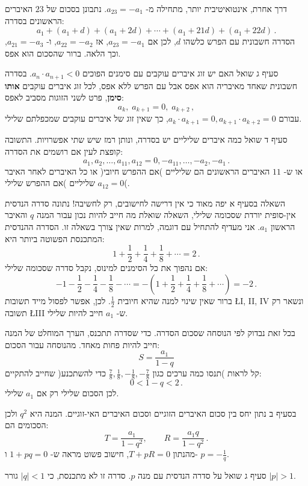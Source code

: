 \documentclass[12pt,a4paper]{article}
\begin{document}
דרך אחרת, אינטואיטיבית יותר, מתחילה מ-%
$a_{23}=-a_1$.
נתבונן בסכום של
$23$
האיברים הראשונים בסדרה:
\[
a_1 + (a_1+d) + (a_1+2d) + \cdots + (a_1+21d) + (a_1+22d)\,.
\]
הסדרה חשבונית עם הפרש כלשהו
$d$,
לכן אם
$a_{23} = -a_1$,
אז
$a_{22} = -a_2$,
ו-%
$a_{21} = -a_3$,
וכך הלאה. ברור שהסכום הוא אפס. 

סעיף ג שואל האם יש זוג איברים עוקבים עם סימנים הפוכים
$a_n\cdot a_{n+1} < 0$.
בסדרה חשבונית שאחד מאיבריה הוא אפס אבל עם הפרש ללא אפס, לכל זוג איברים עוקבים
\textbf{אותו סימן},
פרט לשני הזוגות מסביב לאפס:
\[
a_k,\; a_{k+1}=0,\; a_{k+2}\,,
\]
עבורם
$a_k\cdot a_{k+1} = 0, a_{k+1}\cdot a_{k+2} = 0$,
כך שאין זוג של איברים עוקבים שמכפלתם שלילי.

סעיף ד שואל כמה איברים שליליים יש בסדרה, ונותן רמז שיש שתי אפשרויות. התשובה קופצת לעין אם רושמים את הסדרה:
\[
a_1, a_2, \ldots, a_{11}, a_{12}=0, -a_{11}, \ldots, -a_2, -a_1\,.
\]
או ש-%
$11$
האיברים הראשונים הם שליליים )אם ההפרש חיובי( או כל האיברים לאחר האיבר
$a_{12}=0$
שליליים )אם ההפרש שלילי(.

\newpage

\textbf{}
השאלה בסעיף א יפה מאוד כי אין דרישה לחישובים, רק לחשיבה! נתונה סדרה הנדסית אין-סופית יורדת שסכומה שלילי, השאלה שואלת מה חייב להיות נכון עבור המנה
$q$
והאיבר הראשון 
$a_1$.
אני מעדיף להתחיל עם דוגמה, למרות שאין צורך בשאלה זו. הסדרה ההנדסית המתכנסת הפשוטה ביותר היא:
\[
1+ \frac{1}{2} + \frac{1}{4} + \frac{1}{8} + \cdots = 2\,.
\]
אם נהפוך את כל הסימנים למינוס, נקבל סדרה שסכומה שלילי:
\[
-1 - \frac{1}{2} - \frac{1}{4} - \frac{1}{8} - \cdots = -\left(1+ \frac{1}{2} + \frac{1}{4} + \frac{1}{8} + \cdots\right) = -2\,.
\]
ברור שאין שינוי למנה שהיא חיובית
$\frac{1}{2}$.
לכן, אפשר לפסול מייד תשובות 
\L{I, II, IV}
ונשאר רק תשובה
\L{III}
ש-%
$a_1$
חייב להיות שלילי.

בכל זאת נבדוק לפי הנוסחה שסכום הסדרה. כדי שסדרה תתכנס, הערך המוחלט של המנה חייב להיות פחות מאחד. מהנוסחה עבור הסכום:
\[
S = \frac{a_1}{1-q}
\]
קל לראות )תנסו כמה ערכים כגון 
$\frac{7}{8}, \frac{1}{8}, -\frac{1}{8}, -\frac{7}{8}$
כדי להשתכנע( שחייב להתקיים:
\[
0 < 1-q < 2\,.
\]
לכן הסכום שלילי רק אם
$a_1$
שלילי.

בסעיף ב נתון יחס בין סכום האיברים הזוגיים וסכום האיברים האי-זוגיים. המנה היא
$q^2$
ולכן הסכומים הם:
\[
T = \frac{a_1}{1-q^2},\quad\quad R = \frac{a_1q}{1-q^2}\,.
\]
מהנתון
$T+pR=0$,
חישוב פשוט מראה ש-%
$1+pq=0$
ו-%
$p=-\displaystyle\frac{1}{q}$.

סעיף ג שואל על סדרה הנדסית עם מנה
$p$.
סדרה זו לא מתכנסת, כי 
$|q|<1$
גורר
$|p|>1$.
\end{document}
